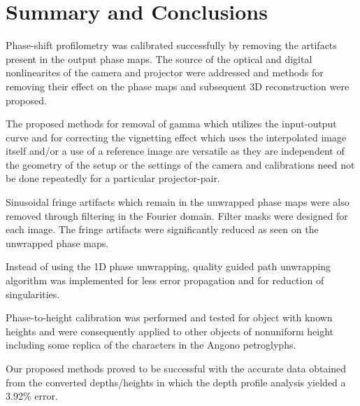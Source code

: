 \chapter{Summary and Conclusions}

Phase-shift profilometry was calibrated successfully by removing the artifacts present in the output phase maps. The source of the optical and digital nonlinearites of the camera and projector were addressed and methods for removing their effect on the phase maps and subsequent 3D reconstruction were proposed. 

The proposed methods for removal of gamma which utilizes the input-output curve and for correcting the vignetting effect which uses the interpolated image itself and/or a use of a reference image are versatile as they are independent of the geometry of the setup or the settings of the camera and calibrations need not be done repeatedly for a particular projector-pair.

Sinusoidal fringe artifacts which remain in the unwrapped phase maps were also removed through filtering in the Fourier domain. Filter masks were designed for each image. The fringe artifacts were significantly reduced as seen on the unwrapped phase maps.

Instead of using the 1D phase unwrapping, quality guided path unwrapping algorithm was implemented for less error propagation and for reduction of singularities.

Phase-to-height calibration was performed and tested for object with known heights and were consequently applied to other objects of nonuniform height including some replica of  the characters in the Angono petroglyphs. 

Our proposed methods proved to be successful with the accurate data obtained from the converted depths/heights in which the depth profile analysis yielded a 3.92\% error.
